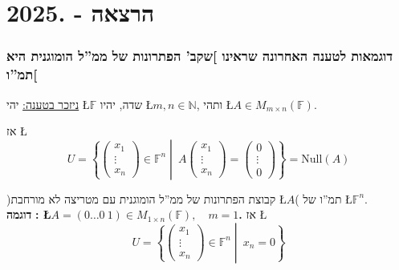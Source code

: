 \documentclass[english,hebrew]{article}
\begin{document}
\newpage{}

\noindent{}

\part{הרצאה {\endL} - {.2025\endL}}

\section{דוגמאות לטענה האחרונה שראינו {]}שקב' הפתרונות של ממ\textquotedblright ל
הומוגנית היא תמ\textquotedblright ו{[}}

\uline{ניזכר בטענה:} יהי \L{$\mathbb{F}$} שדה, יהיו \L{$m,n\in\mathbb{N}$},
ותהי \L{$A\in M_{m\times n}(\mathbb{F})$}.

אז \L{%
\[
U=\left\{ \begin{pmatrix}x_{1}\\
\vdots\\
x_{n}
\end{pmatrix}\in\mathbb{F}^{n}\middle|\:A\begin{pmatrix}x_{1}\\
\vdots\\
x_{n}
\end{pmatrix}=\begin{pmatrix}0\\
\vdots\\
0
\end{pmatrix}\right\} =\text{Null}(A)
\]
}%

)קבוצת הפתרונות של ממ\textquotedblright ל הומוגנית עם מטריצה לא מורחבת
\L{$A$}( תמ\textquotedblright ו של \L{$\mathbb{F}^{n}$}.\\

\textbf{דוגמה }\textbf{{}\endL}\textbf{: \quad{}\L{$A=(0\dots0\:1)\in M_{1\times n}(\mathbb{F}),\quad m=1$}.}
אז \L{%
\[
U=\left\{ \begin{pmatrix}x_{1}\\
\vdots\\
x_{n}
\end{pmatrix}\in\mathbb{F}^{n}\middle|\:x_{n}=0\right\} 
\]
}%
\end{document}

